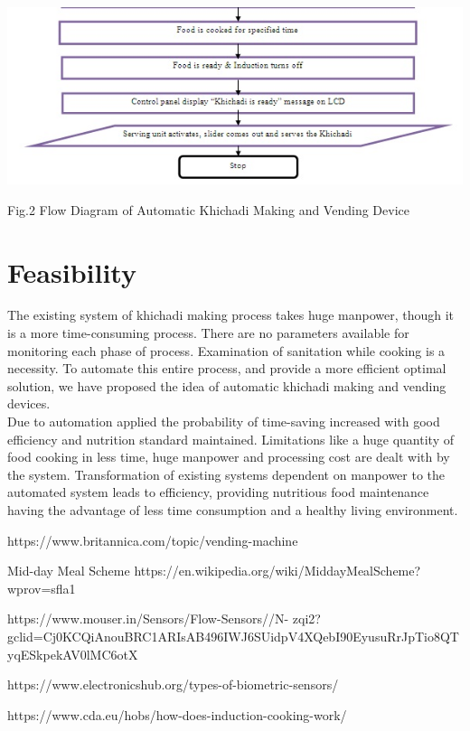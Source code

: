 \documentclass{article}
\begin{document}
\begin{center}\includegraphics[scale=0.8]{flow2}\end{center}
\begin{center}Fig.2 Flow Diagram of Automatic Khichadi Making and Vending Device\end{center}

\section{Feasibility}
The existing system of khichadi making process takes huge manpower, though it is a more time-consuming
process. There are no parameters available for monitoring each phase of process. Examination of sanitation
while cooking is a necessity. To automate this entire process, and provide a more efficient optimal solution,
we have proposed the idea of automatic khichadi making and vending devices.\\
Due to automation applied
the probability of time-saving increased with good efficiency and nutrition standard maintained. Limitations
like a huge quantity of food cooking in less time, huge manpower and processing cost are dealt with by the
system. Transformation of existing systems dependent on manpower to the automated system leads to
efficiency, providing nutritious food maintenance having the advantage of less time consumption and a
healthy living environment.
\begin{thebibliography}{9}
	\bibitem{}
	 https://www.britannica.com/topic/vending-machine
	 
	 \bibitem{}
	Mid-day Meal Scheme
	https://en.wikipedia.org/wiki/Midday\textunderscore Meal\textunderscore Scheme?wprov=sfla1
	 
	 \bibitem{}
	https://www.mouser.in/Sensors/Flow-Sensors/\textunderscore /N-            
	zqi2?gclid=Cj0KCQiAno\textunderscore uBRC1ARIsAB496IWJ6SUidpV4XQebI90Eyus\textunderscore uR\textunderscore rJpTio8QTyqESkpekAV0lMC6otX
	 
	\bibitem{}
 https://www.electronicshub.org/types-of-biometric-sensors/
 
    \bibitem{}
    https://www.cda.eu/hobs/how-does-induction-cooking-work/
\end{thebibliography} %
\end{document}
